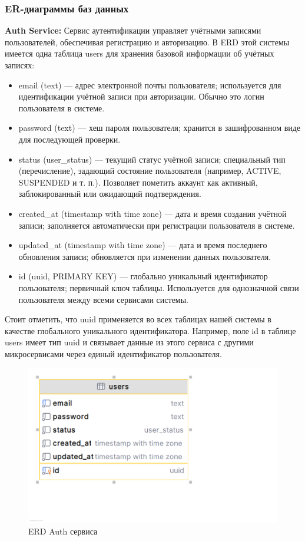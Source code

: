 \subsubsection*{ER-диаграммы баз данных}
\textbf{Auth Service:} Сервис аутентификации управляет учётными записями пользователей, обеспечивая регистрацию и авторизацию. В ERD этой системы имеется одна таблица users для хранения базовой информации об учётных записях:
\begin{itemize}
    \item email (text) — адрес электронной почты пользователя; используется для идентификации учётной записи при авторизации. Обычно это логин пользователя в системе.
    \item password (text) — хеш пароля пользователя; хранится в зашифрованном виде для последующей проверки.
    \item status (user\_status) — текущий статус учётной записи; специальный тип (перечисление), задающий состояние пользователя (например, ACTIVE, SUSPENDED и т. п.). Позволяет пометить аккаунт как активный, заблокированный или ожидающий подтверждения.
    \item created\_at (timestamp with time zone) — дата и время создания учётной записи; заполняется автоматически при регистрации пользователя в системе.
    \item updated\_at (timestamp with time zone) — дата и время последнего обновления записи; обновляется при изменении данных пользователя.
    \item id (uuid, PRIMARY KEY) — глобально уникальный идентификатор пользователя; первичный ключ таблицы. Используется для однозначной связи пользователя между всеми сервисами системы.
\end{itemize}
\noindent Стоит отметить, что uuid применяется во всех таблицах нашей системы в качестве глобального уникального идентификатора. Например, поле id в таблице users имеет тип uuid и связывает данные из этого сервиса с другими микросервисами через единый идентификатор пользователя.
\begin{figure}[H]
        \centering
        \includegraphics[width=0.8\linewidth]{Images/second_chapter_backend_architecture/Picture10.png}
        \caption{ERD Auth сервиса}
        \label{fig:auth-service-erd}
\end{figure}

